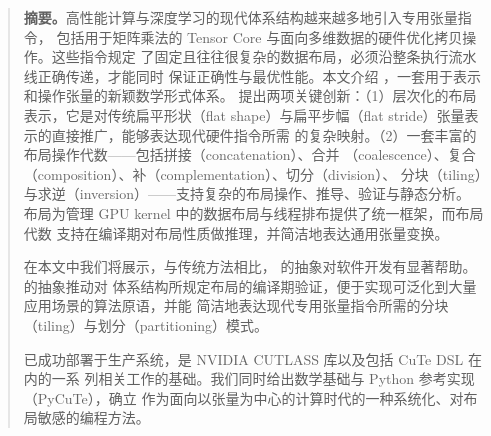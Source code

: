\begin{quotation}\noindent\small
\textbf{摘要。}高性能计算与深度学习的现代体系结构越来越多地引入专用张量指令，
包括用于矩阵乘法的 Tensor Core 与面向多维数据的硬件优化拷贝操作。这些指令规定
了固定且往往很复杂的数据布局，必须沿整条执行流水线正确传递，才能同时
保证正确性与最优性能。本文介绍 \CuTe{}，一套用于表示和操作张量的新颖数学形式体系。
\CuTe{} 提出两项关键创新：（1）层次化的布局表示，它是对传统扁平形状（flat
shape）与扁平步幅（flat stride）张量表示的直接推广，能够表达现代硬件指令所需
的复杂映射。（2）一套丰富的布局操作代数——包括拼接（concatenation）、合并
（coalescence）、复合（composition）、补（complementation）、切分（division）、
分块（tiling）与求逆（inversion）——支持复杂的布局操作、推导、验证与静态分析。
\CuTe{} 布局为管理 GPU kernel 中的数据布局与线程排布提供了统一框架，而布局代数
支持在编译期对布局性质做推理，并简洁地表达通用张量变换。

在本文中我们将展示，与传统方法相比，\CuTe{} 的抽象对软件开发有显著帮助。\CuTe{} 的抽象推动对
体系结构所规定布局的编译期验证，便于实现可泛化到大量应用场景的算法原语，并能
简洁地表达现代专用张量指令所需的分块（tiling）与划分（partitioning）模式。

\CuTe{} 已成功部署于生产系统，是 NVIDIA CUTLASS 库以及包括 CuTe DSL 在内的一系
列相关工作的基础。我们同时给出数学基础与 Python 参考实现（PyCuTe），确立 \CuTe{}
作为面向以张量为中心的计算时代的一种系统化、对布局敏感的编程方法。
\end{quotation}










\endgroup
